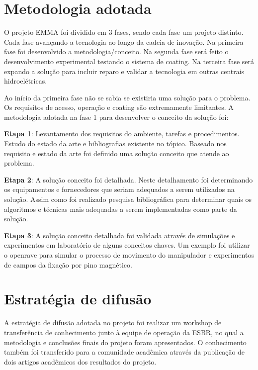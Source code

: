 \section{Metodologia adotada}

O projeto EMMA foi dividido em 3 fases, sendo cada fase um projeto distinto.
Cada fase avançando a tecnologia ao longo da cadeia de inovação. Na primeira
fase foi desenvolvido a metodologia/conceito. Na segunda fase será feito o
desenvolvimento experimental testando o sistema de coating. Na terceira fase
será expando a solução para incluir reparo e validar a tecnologia em outras
centrais hidroelétricas.

Ao início da primeira fase não se sabia se existiria uma solução para o
problema. Os requisitos de acesso, operação e coating são extremamente
limitantes. A metodologia adotada na fase 1 para desenvolver o conceito da
solução foi:

\textbf{Etapa 1}: Levantamento dos requisitos do ambiente, tarefas e
procedimentos.
Estudo do estado da arte e bibliografias existente no tópico. Baseado nos
requisito e estado da arte foi definido uma solução conceito que atende ao problema.

\textbf{Etapa 2}: A solução conceito foi detalhada. Neste detalhamento foi
determinando os equipamentos e fornecedores que seriam adequados a serem
utilizados na solução. Assim como foi realizado pesquisa bibliográfica para
determinar quais os algoritmos e técnicas mais adequadas a serem implementadas
como parte da solução.

\textbf{Etapa 3}:  A solução conceito detalhada foi validada através de
simulações e experimentos em laboratório de alguns conceitos chaves. Um exemplo
foi utilizar o openrave para simular o processo de movimento do manipulador e
experimentos de campos da fixação por pino magnético.

\section{Estratégia de difusão}

A estratégia de difusão adotada no projeto foi realizar um workshop de
transferência de conhecimento junto à equipe de operação da ESBR, no qual a
metodologia e conclusões finais do projeto foram apresentados. O conhecimento
também foi transferido para a comunidade acadêmica através da publicação de
dois artigos acadêmicos dos resultados do projeto.


